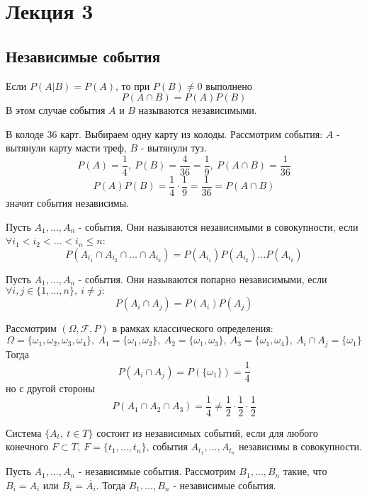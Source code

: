 \documentclass[a4paper, 12pt]{article}
\begin{document}
\section{Лекция 3}
\subsection{Независимые события}
\begin{definition}
    Если $P(A|B)=P(A)$, то при $P(B)\ne 0$ выполнено
    \[P(A\cap B)=P(A)P(B)\]
    В этом случае события $A$ и $B$ называются независимыми.
\end{definition}
\begin{example}
    В колоде 36 карт. Выбираем одну карту из колоды. Рассмотрим события: $A$ - вытянули карту масти треф, $B$ - вытянули туз.
    \[P(A)=\frac{1}{4},\ P(B)=\frac{4}{36}=\frac{1}{9},\ P(A\cap B)=\frac{1}{36}\]
    \[P(A)P(B)=\frac{1}{4}\cdot\frac{1}{9}=\frac{1}{36}=P(A\cap B)\]
    значит события независимы.
\end{example}
\begin{definition}
    Пусть $A_1,\dots,A_n$ - события. Они называются независимыми в совокупности, если $\forall i_1<i_2<\dots<i_n\leq n$:
    \[P(A_{i_1}\cap A_{i_2}\cap \dots \cap A_{i_k})=P(A_{i_1}) P(A_{i_2}) \dots P(A_{i_k})\]
\end{definition}
\begin{definition}
    Пусть $A_1,\dots,A_n$ - события. Они называются попарно независимыми, если $\forall i,j\in \{1,\dots,n\},\ i\ne j:$
    \[P(A_i\cap A_j)=P(A_i)P(A_j)\]
\end{definition}
\begin{example}
    Рассмотрим $(\Omega, \mathcal{F}, P)$ в рамках классического определения: 
    \[\Omega=\{\omega_1,\omega_2,\omega_3,\omega_4\},\ A_1=\{\omega_1, \omega_2\},\ A_2=\{\omega_1,\omega_3\},\ A_3=\{\omega_1,\omega_4\},\ A_i\cap A_j=\{\omega_1\}\] 
    Тогда 
    \[P(A_i\cap A_j)=P(\{\omega_1\})=\frac{1}{4}\] 
    но с другой стороны 
    \[P(A_1\cap A_2\cap A_3)=\frac{1}{4} \ne \frac{1}{2}\cdot\frac{1}{2}\cdot\frac{1}{2}\]
\end{example}
\begin{definition}
    Система $\{A_t,\ t\in T\}$ состоит из независимых событий, если для любого конечного $F\subset T,\ F=\{t_1,\dots,t_n\}$, события $A_{t_1},\dots, A_{t_n}$ независимы в совокупности.
\end{definition}
\begin{lemma}\label{lem1}
    Пусть $A_1,\dots,A_n$ - независимые события. Рассмотрим $B_1,\dots,B_n$ такие, что $B_i=A_i$ или $B_i=\overline{A_i}$. Тогда $B_1,\dots,B_n$ - независимые события. 
\end{lemma}
\end{document}
